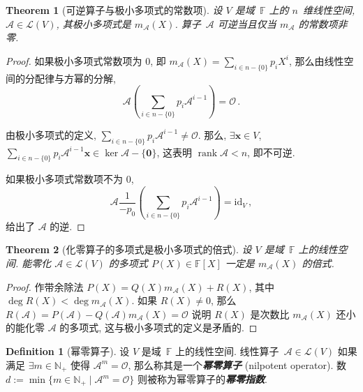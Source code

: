 \documentclass[openany]{ctexbook}
\newcommand*{\indexbf}[1]{\emph{\textbf{#1}}\index{#1}} %
\theoremstyle{plain}
\newtheorem{theorem}{Theorem}[section] %
\theoremstyle{definition}
\newtheorem{definition}{Definition}[section] %
\newcommand*{\bv}{\boldsymbol} %
\newcommand*{\id}{\mathrm{id}} %
\DeclareMathOperator{\rank}{rank}
\begin{document}
\begin{theorem}[可逆算子与极小多项式的常数项]
	设 $V$ 是域~$\mathbb F$ 上的 $n$~维线性空间, $\mathscr A \in \mathcal L(V)$, 其极小多项式是 $m_\mathscr A (X)$. 
	算子~$\mathscr A$ 可逆当且仅当 $m_\mathscr A$ 的常数项非零.
\end{theorem}
\begin{proof}
	如果极小多项式常数项为 $0$, 即 $m_\mathscr A(X) = \sum_{i \in n - \{0\}} p_i X^i$, 那么由线性空间的分配律与方幂的分解,
	\begin{equation*}
		\mathscr A 
		\left(
			\sum_{i \in n - \{0\}} p_i \mathscr A^{i - 1}
		\right) = \mathscr O\,.
	\end{equation*}

	由极小多项式的定义, $\sum_{i \in n - \{0\}} p_i \mathscr A^{i - 1} \neq \mathscr O$. 
	那么, $\exists \bv x \in V$, $\sum_{i \in n - \{0\}} p_i \mathscr A^{i - 1} \bv x \in \ker \mathscr A - \{\bv 0\}$, 这表明 $\rank \mathscr A < n$, 即不可逆. 

	如果极小多项式常数项不为 $0$, 
	\begin{equation*}
		\mathscr A \frac{1}{- p_0} 
		\left(
			\sum_{i \in n - \{0\}} p_i \mathscr A^{i - 1}
		\right) = \id_V\,,
	\end{equation*}
	给出了 $\mathscr A$ 的逆.
\end{proof}

\begin{theorem}[化零算子的多项式是极小多项式的倍式]
	设 $V$ 是域~$\mathbb F$ 上的线性空间.
	能零化 $\mathscr A \in \mathcal L (V)$ 的多项式 $P(X) \in \mathbb F[X]$ 一定是 $m_\mathscr A (X)$ 的倍式.
\end{theorem}
\begin{proof}
	作带余除法 $P(X) = Q(X) m_\mathscr A(X) + R(X)$, 其中 $\deg R(X) < \deg m_\mathscr A(X)$. 
	如果 $R(X) \neq 0$, 那么 $R(\mathscr A) = P(\mathscr A) - Q(\mathscr A) m_\mathscr A(X) = \mathscr O$ 说明 $R(X)$ 是次数比 $m_\mathscr A(X)$ 还小的能化零 $\mathscr A$ 的多项式, 这与极小多项式的定义是矛盾的.
\end{proof}

\begin{definition}[幂零算子]
	设 $V$ 是域~$\mathbb F$ 上的线性空间.
	线性算子~$\mathscr A \in \mathcal L(V)$ 如果满足 $\exists m \in \mathbb N_+$ 使得 $\mathscr A^m = \mathscr O$, 那么称其是一个\indexbf{幂零算子} (nilpotent operator). 
	数~$d := \min \{m \in \mathbb N_+ \mid \mathscr A^m = \mathscr O\}$ 则被称为幂零算子的\indexbf{幂零指数}.
\end{definition}
\end{document}
